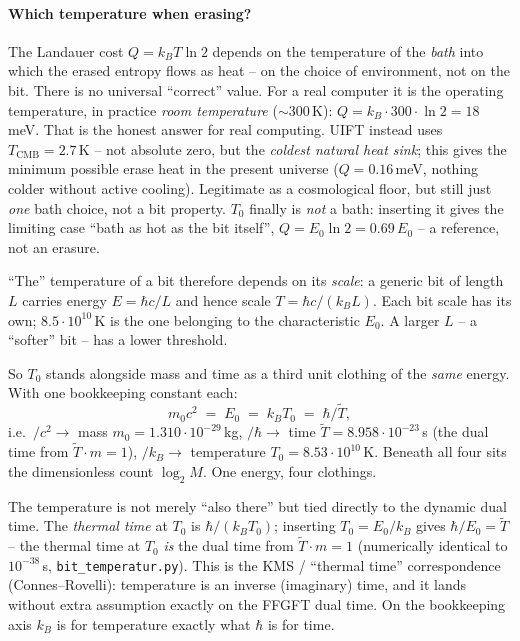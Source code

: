 \paragraph{Which temperature when erasing?} The Landauer cost $Q=k_B T\ln2$ depends on the temperature of
the \emph{bath} into which the erased entropy flows as heat -- on the choice of environment, not on the
bit. There is no universal \enquote{correct} value. For a real computer it is the operating temperature,
in practice \emph{room temperature} ($\sim300$\,K): $Q=k_B\cdot300\cdot\ln2=18$\,meV. That is the honest
answer for real computing. UIFT instead uses $T_\text{CMB}=2.7$\,K -- not absolute zero, but the
\emph{coldest natural heat sink}; this gives the minimum possible erase heat in the present universe
($Q=0.16$\,meV, nothing colder without active cooling). Legitimate as a cosmological floor, but still just
\emph{one} bath choice, not a bit property. $T_0$ finally is \emph{not} a bath: inserting it gives the
limiting case \enquote{bath as hot as the bit itself}, $Q=E_0\ln2=0.69\,E_0$ -- a reference, not an
erasure.

\enquote{The} temperature of a bit therefore depends on its \emph{scale}: a generic bit of length $L$
carries energy $E=\hbar c/L$ and hence scale $T=\hbar c/(k_B L)$. Each bit scale has its own;
$8.5\cdot10^{10}$\,K is the one belonging to the characteristic $E_0$. A larger $L$ -- a \enquote{softer}
bit -- has a lower threshold.

So $T_0$ stands alongside mass and time as a third unit clothing of the \emph{same} energy. With one
bookkeeping constant each:
\[
m_0 c^2 \;=\; E_0 \;=\; k_B T_0 \;=\; \hbar/\tilde T,
\]
i.e.\ $/c^2\to$ mass $m_0=1.310\cdot10^{-29}$\,kg, $/\hbar\to$ time $\tilde T=8.958\cdot10^{-23}$\,s (the
dual time from $\tilde T\cdot m=1$), $/k_B\to$ temperature $T_0=8.53\cdot10^{10}$\,K. Beneath all four
sits the dimensionless count $\log_2 M$. One energy, four clothings.

The temperature is not merely \enquote{also there} but tied directly to the dynamic dual time. The
\emph{thermal time} at $T_0$ is $\hbar/(k_B T_0)$; inserting $T_0=E_0/k_B$ gives $\hbar/E_0=\tilde T$ --
the thermal time at $T_0$ \emph{is} the dual time from $\tilde T\cdot m=1$ (numerically identical to
$10^{-38}$\,s, \texttt{bit\_temperatur.py}). This is the KMS / \enquote{thermal time} correspondence
(Connes--Rovelli): temperature is an inverse (imaginary) time, and it lands without extra assumption
exactly on the FFGFT dual time. On the bookkeeping axis $k_B$ is for temperature exactly what $\hbar$ is
for time.

